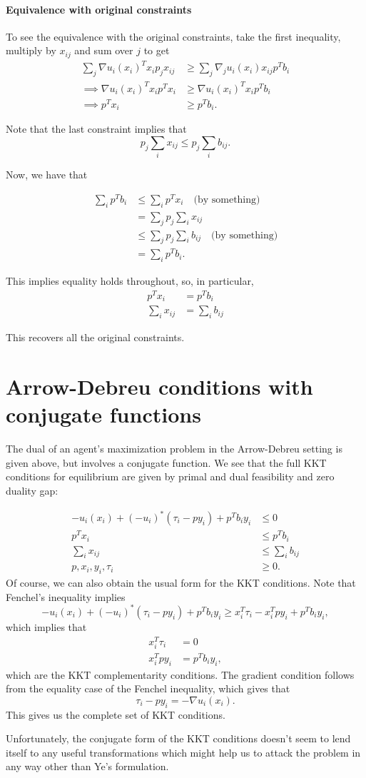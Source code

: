 \documentclass[12pt]{article}
\begin{document}
\paragraph{Equivalence with original constraints}
To see the equivalence with the original constraints, take the first inequality,
multiply by $x_{ij}$ and sum over $j$ to get
\begin{align*}
\sum_j \nabla u_i(x_i)^T x_i p_j x_{ij} &\geq \sum_j \nabla_j u_i(x_i) x_{ij} p^T b_i \\
\implies \nabla u_i(x_i)^T x_i p^T x_i &\geq \nabla u_i(x_i)^T x_i p^T b_i \\
\implies p^T x_i &\geq p^T b_i.
\end{align*}

Note that the last constraint implies that
\[
p_j \sum_i x_{ij} \leq p_j \sum_i b_{ij}.
\]

Now, we have that

\begin{align*}
\sum_i p^T b_i &\leq \sum_i p^T x_i\quad \text{(by something)}\\
&= \sum_j p_j \sum_i x_{ij} \\
&\leq \sum_j p_j \sum_i b_{ij}\quad \text{(by something)}\\
&= \sum_i p^T b_i.
\end{align*}

This implies equality holds throughout, so, in particular,
\begin{align*}
p^T x_i &= p^T b_i\\
\sum_i x_{ij} &= \sum_i b_{ij}
\end{align*}

This recovers all the original constraints.

\section{Arrow-Debreu conditions with conjugate functions}
The dual of an agent's maximization problem in the Arrow-Debreu setting
is given above, but involves a conjugate function.
We see that the full KKT conditions for equilibrium are given by
primal and dual feasibility and zero duality gap:

\begin{align*}
-u_i(x_i) + (-u_i)^*(\tau_i - p y_i) + p^T b_i y_i &\leq 0\\
p^T x_i &\leq p^T b_i \\
\sum_i x_{ij} &\leq \sum_i b_{ij}\\
p, x_i, y_i, \tau_i &\geq 0.
\end{align*}
Of course, we can also obtain the usual form for the KKT conditions.
Note that Fenchel's inequality implies
\[
-u_i(x_i) + (-u_i)^*(\tau_i - p y_i) + p^T b_i y_i
\geq x_i^T \tau_i - x_i^T p y_i + p^T b_i y_i,
\]
which implies that
\begin{align*}
x_i^T \tau_i &= 0\\
x_i^T p y_i &= p^T b_i y_i,
\end{align*}
which are the KKT complementarity conditions.
The gradient condition follows from the equality case of the Fenchel inequality,
which gives that
\[
\tau_i - p y_i = - \nabla u_i(x_i).
\]
This gives us the complete set of KKT conditions.

Unfortunately, the conjugate form of the KKT conditions doesn't seem to lend
itself to any useful transformations which might help us to attack the problem
in any way other than Ye's formulation.

\newpage


\end{document}
